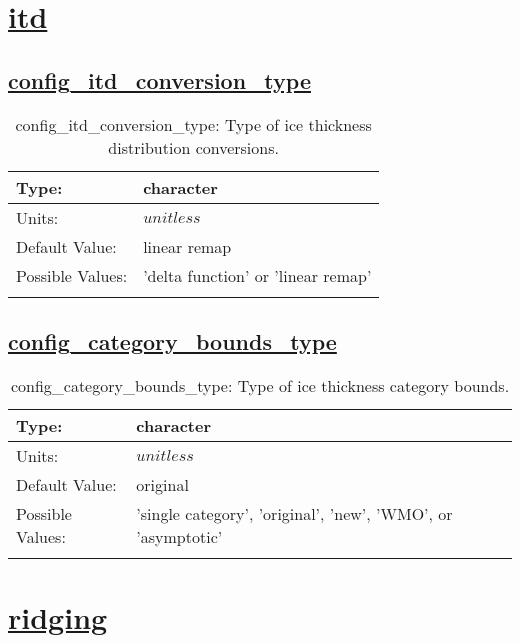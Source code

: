 \section[itd]{\hyperref[sec:nm_tab_itd]{itd}}
\label{sec:nm_sec_itd}
\subsection[config\_itd\_conversion\_type]{\hyperref[sec:nm_tab_itd]{config\_itd\_conversion\_type}}
\label{subsec:nm_sec_config_itd_conversion_type}
\begin{center}
\begin{longtable}{| p{2.0in} || p{4.0in} |}
    \hline
    Type: & character \\
    \hline
    Units: & $unitless$ \\
    \hline
    Default Value: & linear remap \\
    \hline
    Possible Values: & 'delta function' or 'linear remap' \\
    \hline
    \caption{config\_itd\_conversion\_type: Type of ice thickness distribution conversions.}
\end{longtable}
\end{center}
\subsection[config\_category\_bounds\_type]{\hyperref[sec:nm_tab_itd]{config\_category\_bounds\_type}}
\label{subsec:nm_sec_config_category_bounds_type}
\begin{center}
\begin{longtable}{| p{2.0in} || p{4.0in} |}
    \hline
    Type: & character \\
    \hline
    Units: & $unitless$ \\
    \hline
    Default Value: & original \\
    \hline
    Possible Values: & 'single category', 'original', 'new', 'WMO', or 'asymptotic' \\
    \hline
    \caption{config\_category\_bounds\_type: Type of ice thickness category bounds.}
\end{longtable}
\end{center}
\section[ridging]{\hyperref[sec:nm_tab_ridging]{ridging}}
\label{sec:nm_sec_ridging}
